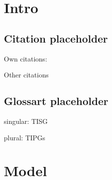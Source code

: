 
\section{Intro}

\subsection{Citation placeholder}
Own citations:~\cite{pub1Key,pub2Key,pub3Key,pub4Key,pub5Key,pub6Key,pub7Key}

Other citations \cite{modric2022midfield,neymar2018roll,worldcupdata2030}

\subsection{Glossart placeholder}

singular: \gls{TISG}

plural: \glspl{TIPG}




\section{Model}
\lipsum[1-3]
